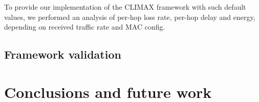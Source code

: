 \documentclass[12pt,journal,compsoc]{IEEEtran}
\begin{document}
To provide our implementation of the CLIMAX framework with such default values, we performed an analysis of per-hop loss rate, per-hop delay and energy, depending on received traffic rate and MAC config.

\subsection{Framework validation}


\section{Conclusions and future work}
\label{ccl}





%

%

\end{document}
